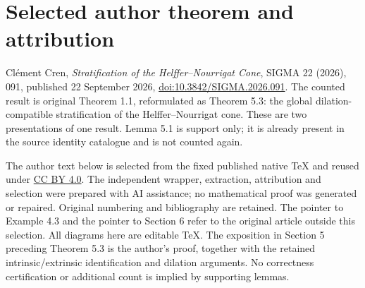\section*{Selected author theorem and attribution}
Cl\'ement Cren, \emph{Stratification of the Helffer--Nourrigat Cone},
SIGMA 22 (2026), 091, published 22 September 2026,
\href{https://doi.org/10.3842/SIGMA.2026.091}{doi:10.3842/SIGMA.2026.091}.
The counted result is original Theorem 1.1, reformulated as Theorem 5.3:
the global dilation-compatible stratification of the Helffer--Nourrigat cone.
These are two presentations of one result. Lemma 5.1 is support only;
it is already present in the source identity catalogue and is not counted again.

The author text below is selected from the fixed published native TeX and reused
under \href{https://creativecommons.org/licenses/by/4.0/}{CC BY 4.0}.
The independent wrapper, extraction, attribution and selection were prepared with AI assistance;
no mathematical proof was generated or repaired.
Original numbering and bibliography are retained. The pointer to Example 4.3
and the pointer to Section 6 refer to the original article outside this selection. All diagrams here are editable TeX.
The exposition in Section 5 preceding Theorem 5.3 is the author's proof, together
with the retained intrinsic/extrinsic identification and dilation arguments.
No correctness certification or additional count is implied by supporting lemmas.
